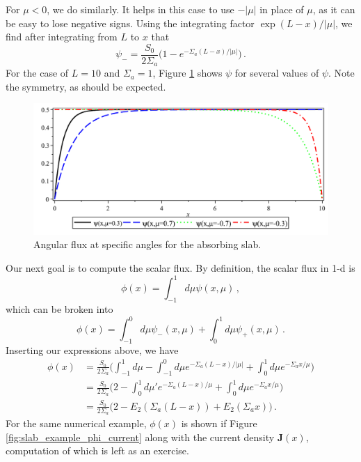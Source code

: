 For $\mu<0$, we do similarly.  It helps in this case to use $-|\mu|$ in place of $\mu$, as it can be easy to lose negative signs.  Using the integrating factor $\exp{(L-x)/|\mu|}$, we find after integrating from $L$ to $x$ that
\begin{equation}
 \psi_{-} = \frac{S_0}{2\Sigma_a}\Bigg (1 - e^{-\Sigma_a (L-x)/|\mu|} \Bigg ) \, .
\end{equation}
For the case of $L = 10$ and $\Sigma_a = 1$, Figure \ref{fig:slab_example_psi} shows $\psi$ for several values of $\psi$.  Note the symmetry, as should be expected. 

\begin{figure}[ht] 
    \centering
    \includegraphics[keepaspectratio, width = 5.0 in]{images/slab_example_psi}
    \caption{Angular flux at specific angles for the absorbing slab.}
    \label{fig:slab_example_psi}
\end{figure}

Our next goal is to compute the scalar flux.  By definition, the scalar flux in 1-d is
\begin{equation}
 \phi(x) = \int^1_{-1} d\mu \psi(x,\mu) \, ,
\end{equation}
which can be broken into
\begin{equation}
  \phi(x) = \int^0_{-1} d\mu \psi_{-}(x,\mu) + \int^1_{0} d\mu \psi_{+}(x,\mu) \, .
\end{equation}
Inserting our expressions above, we have
\begin{equation}
\begin{split}
  \phi(x) &= \frac{S_0}{2\Sigma_a} \Bigg (  \int^{1}_{-1} d\mu - \int^0_{-1} d\mu  e^{-\Sigma_a (L-x)/|\mu|} + \int^1_{0} d\mu e^{-\Sigma_a x/\mu}  \Bigg ) \\
          &= \frac{S_0}{2\Sigma_a} \Bigg ( 2 - \int^1_{0} d\mu'  e^{-\Sigma_a (L-x)/\mu} + \int^1_{0} d\mu e^{-\Sigma_a x/\mu}  \Bigg ) \\
          &= \frac{S_0}{2\Sigma_a} \Bigg ( 2 - E_2(\Sigma_a (L-x)) + E_2(\Sigma_a x)  \Bigg ) \, .
\end{split}
\end{equation}
For the same numerical example, $\phi(x)$ is shown if Figure \ref{fig:slab_example_phi_current} along with the current density $\mathbf{J}(x)$, computation of which is left as an exercise.

